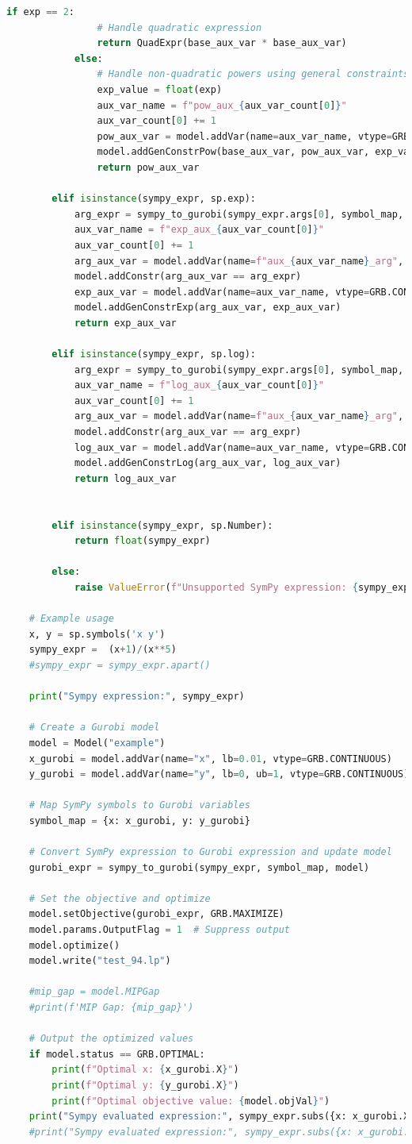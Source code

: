 \documentclass[a4paper,twoside,10pt]{article}
\begin{document}
\begin{lstlisting}[language=Python, caption=Python example]
			if exp == 2:
				# Handle quadratic expression
				return QuadExpr(base_aux_var * base_aux_var)
			else:
				# Handle non-quadratic powers using general constraints
				exp_value = float(exp)
				aux_var_name = f"pow_aux_{aux_var_count[0]}"
				aux_var_count[0] += 1
				pow_aux_var = model.addVar(name=aux_var_name, vtype=GRB.CONTINUOUS)
				model.addGenConstrPow(base_aux_var, pow_aux_var, exp_value)
				return pow_aux_var
		
		elif isinstance(sympy_expr, sp.exp):
			arg_expr = sympy_to_gurobi(sympy_expr.args[0], symbol_map, model, aux_var_count)
			aux_var_name = f"exp_aux_{aux_var_count[0]}"
			aux_var_count[0] += 1
			arg_aux_var = model.addVar(name=f"aux_{aux_var_name}_arg", lb=0, vtype=GRB.CONTINUOUS)
			model.addConstr(arg_aux_var == arg_expr)
			exp_aux_var = model.addVar(name=aux_var_name, vtype=GRB.CONTINUOUS)
			model.addGenConstrExp(arg_aux_var, exp_aux_var)
			return exp_aux_var
		
		elif isinstance(sympy_expr, sp.log):
			arg_expr = sympy_to_gurobi(sympy_expr.args[0], symbol_map, model, aux_var_count)
			aux_var_name = f"log_aux_{aux_var_count[0]}"
			aux_var_count[0] += 1
			arg_aux_var = model.addVar(name=f"aux_{aux_var_name}_arg", vtype=GRB.CONTINUOUS)
			model.addConstr(arg_aux_var == arg_expr)
			log_aux_var = model.addVar(name=aux_var_name, vtype=GRB.CONTINUOUS)
			model.addGenConstrLog(arg_aux_var, log_aux_var)
			return log_aux_var
	
	
		elif isinstance(sympy_expr, sp.Number):
			return float(sympy_expr)
		
		else:
			raise ValueError(f"Unsupported SymPy expression: {sympy_expr}")
	
	# Example usage
	x, y = sp.symbols('x y')
	sympy_expr =  (x+1)/(x**5)
	#sympy_expr = sympy_expr.apart()
	
	print("Sympy expression:", sympy_expr)
	
	# Create a Gurobi model
	model = Model("example")
	x_gurobi = model.addVar(name="x", lb=0.01, vtype=GRB.CONTINUOUS)
	y_gurobi = model.addVar(name="y", lb=0, ub=1, vtype=GRB.CONTINUOUS)
	
	# Map SymPy symbols to Gurobi variables
	symbol_map = {x: x_gurobi, y: y_gurobi}
	
	# Convert SymPy expression to Gurobi expression and update model
	gurobi_expr = sympy_to_gurobi(sympy_expr, symbol_map, model)
	
	# Set the objective and optimize
	model.setObjective(gurobi_expr, GRB.MAXIMIZE)
	model.params.OutputFlag = 1  # Suppress output
	model.optimize()
	model.write("test_94.lp")
	
	#mip_gap = model.MIPGap
	#print(f'MIP Gap: {mip_gap}')
	
	# Output the optimized values
	if model.status == GRB.OPTIMAL:
		print(f"Optimal x: {x_gurobi.X}")
		print(f"Optimal y: {y_gurobi.X}")
		print(f"Optimal objective value: {model.objVal}")
	print("Sympy evaluated expression:", sympy_expr.subs({x: x_gurobi.X, y: y_gurobi.X}).evalf())
	#print("Sympy evaluated expression:", sympy_expr.subs({x: x_gurobi.X}).evalf())

\end{lstlisting}
\end{document}
